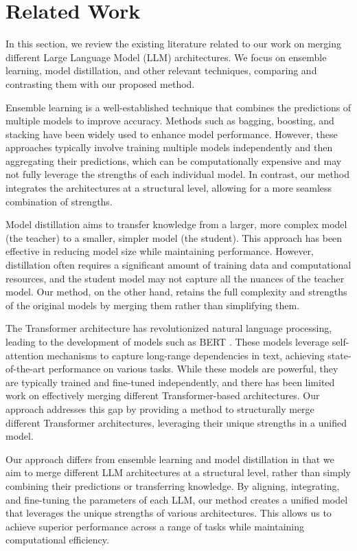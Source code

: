 \documentclass{article} %
\begin{document}

\section{Related Work}
\label{sec:related}

In this section, we review the existing literature related to our work on merging different Large Language Model (LLM) architectures. We focus on ensemble learning, model distillation, and other relevant techniques, comparing and contrasting them with our proposed method.

Ensemble learning is a well-established technique that combines the predictions of multiple models to improve accuracy. Methods such as bagging, boosting, and stacking have been widely used to enhance model performance. However, these approaches typically involve training multiple models independently and then aggregating their predictions, which can be computationally expensive and may not fully leverage the strengths of each individual model. In contrast, our method integrates the architectures at a structural level, allowing for a more seamless combination of strengths.

Model distillation aims to transfer knowledge from a larger, more complex model (the teacher) to a smaller, simpler model (the student). This approach has been effective in reducing model size while maintaining performance. However, distillation often requires a significant amount of training data and computational resources, and the student model may not capture all the nuances of the teacher model. Our method, on the other hand, retains the full complexity and strengths of the original models by merging them rather than simplifying them.

The Transformer architecture has revolutionized natural language processing, leading to the development of models such as BERT \citep{Devlin2019BERTPO}. These models leverage self-attention mechanisms to capture long-range dependencies in text, achieving state-of-the-art performance on various tasks. While these models are powerful, they are typically trained and fine-tuned independently, and there has been limited work on effectively merging different Transformer-based architectures. Our approach addresses this gap by providing a method to structurally merge different Transformer architectures, leveraging their unique strengths in a unified model.

Our approach differs from ensemble learning and model distillation in that we aim to merge different LLM architectures at a structural level, rather than simply combining their predictions or transferring knowledge. By aligning, integrating, and fine-tuning the parameters of each LLM, our method creates a unified model that leverages the unique strengths of various architectures. This allows us to achieve superior performance across a range of tasks while maintaining computational efficiency.
\end{document}
